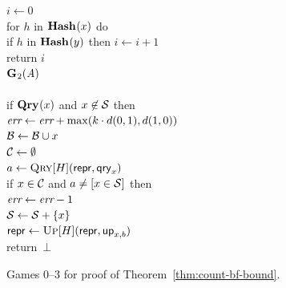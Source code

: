 \begin{figure}
{      $i \gets 0$\\
      for $h$ in $\mathbf{Hash}\hspace{0.5pt}(x)$ do\\
      \tab if $h$ in $\mathbf{Hash}\hspace{0.5pt}(y)$ then $i \gets i+1$\\
      return $i$
    \\[6pt]
    \underline{$\mathbf{G}\hspace{0.5pt}_2(\mathit{A})$}\\[2pt]
    \\
      if $\mathbf{Qry}\hspace{0.5pt}(x)$ and $x \not\in \mathcal{S}$ then\\
      \tab $\textit{err} \gets \textit{err} + \max(k \cdot d(0,1), d(1,0))$\\
      $\mathcal{B} \gets \mathcal{B} \cup x$\\
      $\mathcal{C} \gets \emptyset$\\
      $a \gets \textsc{Qry}[H](\mathsf{repr}, \mathsf{qry}_x)$\\
      if $x \in \mathcal{C}$ and $a \neq [x \in \mathcal{S}]$ then\\
      \tab $\textit{err} \gets \textit{err}-1$\\
      $\mathcal{S} \gets \mathcal{S} + \{x\}$\\
      $\mathsf{repr} \gets \textsc{Up}[H](\mathsf{repr},\mathsf{up}_{x,b})$\\
      return~$\bot$
  }
  {
  }
  {
  }
  \caption{Games 0--3 for proof of Theorem~\ref{thm:count-bf-bound}.}
  \label{fig:count-bf-bound}
\end{figure}

